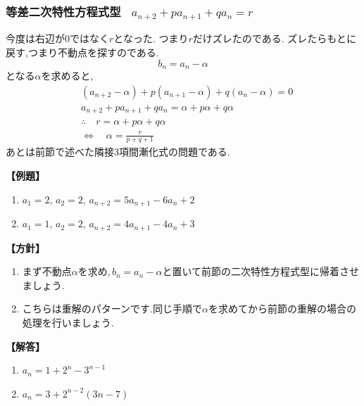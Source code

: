   \subsubsection{等差二次特性方程式型 \, $\displaystyle a_{n+2}+pa_{n+1}+qa_n=r$}
    今度は右辺が0ではなく$r$となった.
    つまり$r$だけズレたのである.
    ズレたらもとに戻す,つまり不動点を探すのである.
    \[
      b_n=a_n-\alpha
    \]
    となる$\alpha$を求めると,
    \begin{align*}
      &(a_{n+2}-\alpha)+p(a_{n+1}-\alpha)+q(a_n-\alpha)=0\\
      &a_{n+2}+pa_{n+1}+qa_n=\alpha+p\alpha+q\alpha\\
      &\therefore \quad r=\alpha +p\alpha +q\alpha\\
      &\Leftrightarrow \quad \alpha=\frac{r}{p+q+1}
    \end{align*}
    あとは前節で述べた隣接3項間漸化式の問題である.

    \noindent \textbf{【例題】}
    \begin{enumerate}[label=(\arabic*),parsep=3pt]
      \item $\displaystyle a_1=2,\,a_2=2,\, a_{n+2}=5a_{n+1}-6a_n+2$
      \item $\displaystyle a_1=1,\,a_2=2,\, a_{n+2}=4a_{n+1}-4a_n+3$
    \end{enumerate}

    \noindent\textbf{【方針】}
    \begin{enumerate}[label=(\arabic*),parsep=3pt]
      \item まず不動点$\alpha$を求め,\,$b_n=a_n-\alpha$と置いて前節の二次特性方程式型に帰着させましょう.
      \item こちらは重解のパターンです.同じ手順で$\alpha$を求めてから前節の重解の場合の処理を行いましょう.
    \end{enumerate}

    \noindent\textbf{【解答】}
    \begin{enumerate}[label=(\arabic*),parsep=3pt]
      \item $\displaystyle a_n=1+2^n-3^{n-1}$
      \item $\displaystyle a_n=3+2^{n-2}(3n-7)$
    \end{enumerate}

